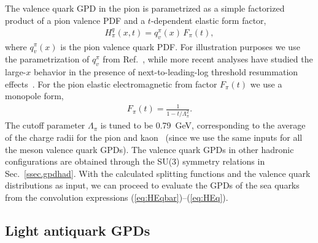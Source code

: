 \documentclass[preprintnumbers,prd,superscriptaddress,preprint]{revtex4-1}
\begin{document}
The valence quark GPD in the pion is parametrized as a simple factorized product of a pion valence PDF and a $t$-dependent elastic form factor,
%
\begin{eqnarray}
H^q_{\pi}(x,t) = q^\pi_v(x)\, F_\pi(t),
\end{eqnarray}
%
where $q^\pi_v(x)$ is the pion valence quark PDF.
For illustration purposes we use the parametrization of $q^\pi_v$ from Ref.~\cite{Aicher:2010cb}, while more recent analyses have studied the large-$x$ behavior in the presence of next-to-leading-log threshold resummation effects~\cite{Barry:2021osv}.
For the pion elastic electromagnetic from factor $F_\pi(t)$ we use a monopole form,
%
\begin{eqnarray}
F_\pi(t) = \frac{1}{1-t/\Lambda_\pi^2}.
\end{eqnarray}
%
The cutoff parameter $\Lambda_\pi$ is tuned to be 0.79~GeV, corresponding to the average of the charge radii for the pion and kaon~\cite{ParticleDataGroup:2018ovx} (since we use the same inputs for all the meson valence quark GPDs).
The valence quark GPDs in other hadronic configurations are obtained through the SU(3) symmetry relations in Sec.~\ref{ssec.gpdhad}.
With the calculated splitting functions and the valence quark distributions as input, we can proceed to evaluate the GPDs of the sea quarks from the convolution expressions (\ref{eq:HEqbar})--(\ref{eq:HEq}).




\subsection{Light antiquark GPDs}
\end{document}
